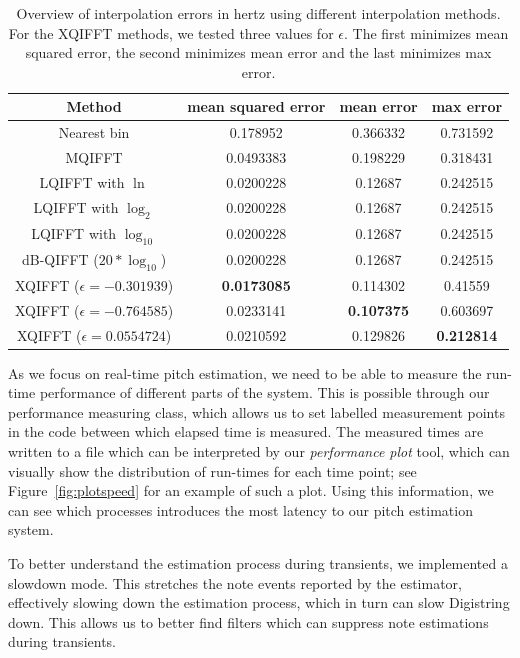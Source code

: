 \documentclass[a4paper,10pt,twocolumn]{article}
\begin{document}
\begin{table}[b!]
    \centering
    \begin{tabular}{c|ccc}
        Method & mean squared error & mean error & max error \\
        \hline
        Nearest bin & 0.178952 & 0.366332 & 0.731592 \\
        MQIFFT & 0.0493383 & 0.198229 & 0.318431 \\
        LQIFFT with $\ln$ & 0.0200228 & 0.12687 & 0.242515 \\
        LQIFFT with $\log_2$ & 0.0200228 & 0.12687 & 0.242515 \\
        LQIFFT with $\log_{10}$ & 0.0200228 & 0.12687 & 0.242515 \\
        dB-QIFFT ($20 * \log_{10}$) & 0.0200228 & 0.12687 & 0.242515 \\
        XQIFFT ($\epsilon = -0.301939$) & \textbf{0.0173085} & 0.114302 & 0.41559 \\
        XQIFFT ($\epsilon = -0.764585$) & 0.0233141 & \textbf{0.107375} & 0.603697 \\
        XQIFFT ($\epsilon = 0.0554724$) & 0.0210592 & 0.129826 & \textbf{0.212814}
    \end{tabular}
    \caption{Overview of interpolation errors in hertz using different interpolation methods. For the XQIFFT methods, we tested three values for $\epsilon$. The first minimizes mean squared error, the second minimizes mean error and the last minimizes max error.}
    \label{tab:qifft_error}
\end{table}

As we focus on real-time pitch estimation, we need to be able to measure the run-time performance of different parts of the system. This is possible through our performance measuring class, which allows us to set labelled measurement points in the code between which elapsed time is measured. The measured times are written to a file which can be interpreted by our \textit{performance plot} tool, which can visually show the distribution of run-times for each time point; see Figure~\ref{fig:plotspeed} for an example of such a plot. Using this information, we can see which processes introduces the most latency to our pitch estimation system.

To better understand the estimation process during transients, we implemented a slowdown mode. This stretches the note events reported by the estimator, effectively slowing down the estimation process, which in turn can slow Digistring down. This allows us to better find filters which can suppress note estimations during transients.
\end{document}
